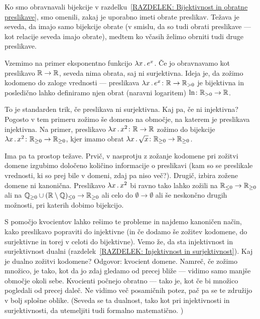 
                Ko smo obravnavali bijekcije v razdelku~\ref{RAZDELEK: Bijektivnost in obratne preslikave}, smo omenili, zakaj je uporabno imeti obrate preslikav. Težava je seveda, da imajo samo bijekcije obrate (v smislu, da so tudi obrati preslikave --- kot relacije seveda imajo obrate), medtem ko včasih želimo obrniti tudi druge preslikave.

                Vzemimo na primer eksponentno funkcijo $\xlam{x}{e^x}$. Če jo obravnavamo kot preslikavo $\mathbb{R} \to \mathbb{R}$, seveda nima obrata, saj ni surjektivna. Ideja je, da zožimo kodomeno do zaloge vrednosti --- preslikava $\xlam{x}{e^x}\colon \RR \to \RR_{> 0}$ je bijektivna in posledično lahko definiramo njen obrat (naravni logaritem) $\ln\colon \mathbb{R}_{> 0} \to \mathbb{R}$.

                To je standarden trik, če preslikava ni surjektivna. Kaj pa, če ni injektivna? Pogosto v tem primeru zožimo še domeno na območje, na katerem je preslikava injektivna. Na primer, preslikavo $\xlam{x}{x^2}\colon \RR \to \RR$ zožimo do bijekcije $\xlam{x}{x^2}\colon \RR_{\geq 0} \to \RR_{\geq 0}$, kjer imamo obrat $\xlam{x}{\sqrt{x}}\colon \RR_{\geq 0} \to \RR_{\geq 0}$.

                Ima pa ta prostop težave. Prvič, v nasprotju z zožanje kodomene pri zožitvi domene izgubimo določeno količino informacije o preslikavi (kam so se preslikale vrednosti, ki so prej bile v domeni, zdaj pa niso več?). Drugič, izbira zožene domene ni kanonična. Preslikavo $\xlam{x}{x^2}$ bi ravno tako lahko zožili na $\mathbb{R}_{\leq 0} \to \mathbb{R}_{\geq 0}$ ali na $\mathbb{Q}_{\geq 0} \cup (\mathbb{R} \setminus \mathbb{Q})_{\leq 0} \to \mathbb{R}_{\geq 0}$ ali celo do $\emptyset \to \emptyset$ ali še neskončno drugih možnosti, pri katerih dobimo bijekcijo.

                S pomočjo kvocientov lahko rešimo te probleme in najdemo kanoničen način, kako preslikavo popraviti do injektivne (in če dodamo še zožitev kodomene, do surjektivne in torej v celoti do bijektivne). Vemo že, da sta injektivnost in surjektivnost dualni (razdelek~\ref{RAZDELEK: Injektivnost in surjektivnost}). Kaj je dualno zožitvi kodomene? Odgovor: kvocient domene. Namreč, če zožimo množico, je tako, kot da jo zdaj gledamo od precej bliže --- vidimo samo manjše območje okoli sebe. Kvocienti počnejo obratno --- tako je, kot če bi množico pogledali od precej daleč. Ne vidimo več posamičnih potez, pač pa se te združijo v bolj splošne oblike. (Seveda se ta dualnost, tako kot pri injektivnosti in surjektivnosti, da utemeljiti tudi formalno matematično. )

